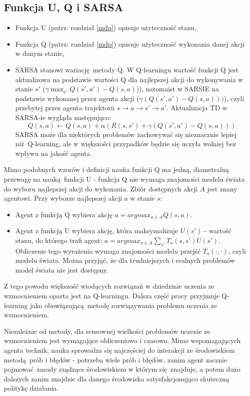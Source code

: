 \subsection{Funkcja U, Q i SARSA}\label{qlearning}
\begin{itemize}
\item Funkcja U (patrz: rozdział \ref{mdp}) opisuje użyteczność stanu,
\item Funkcja Q (patrz: rozdział \ref{mdp}) opisuje użyteczność wykonania danej akcji w danym stanie,
\item SARSA stanowi wariację metody Q. W Q-learningu wartość funkcji Q jest aktualizowa na podstawie wartości Q dla najlepszej akcji do wykonywania w stanie $s'$ ($\gamma \max_{a'}Q(s',a') - Q (s,a))$), natomaist w SARSIE na podstawie wykonanej przez agenta akcji ($\gamma (Q(s',a') - Q (s,a)))$), czyli przebytej przez agenta trajektorii $ s \rightarrow a \rightarrow s' \rightarrow a'$. Aktualizacja TD w SARSA-ie wygląda następująco:
$$Q(s,a) \leftarrow Q(s,a) + \alpha (R(s,s') + \gamma (Q(s',a') - Q (s,a)))$$
SARSA może dla niektórych problemów zachowywać się nieznacznie lepiej niż Q-learning, ale w większości przypadków będzie się uczyła wolniej bez wpływu na jakość agenta.
\end{itemize}

Mimo podobnych wzorów i definicji nauka funkcji Q ma jedną, diametralną przewagę na nauką funkcji U - funkcja Q nie wymaga znajomości modelu świata do wyboru najlepszej akcji do wykonania. Zbiór dostępnych akcji $A$ jest znany agentowi. Przy wyborze najlepszej akcji $a$ w stanie $s$:
\begin{itemize}
\item Agent z funkcją Q wybiera akcję $a = argmax_{a \in A} Q(s,a)$.

\item Agent z funkcją U wybiera akcję, która maksymalizuje $U(s')$ - wartość stanu, do którego trafi agent: $a = argmax_{a \in A} \sum_{s'} T_a(s,s')U(s')$. Obliczenie tego wyrażenia wymaga znajomości modelu przejść $T_a(\cdot, \cdot)$, czyli modelu świata. Można przyjąć, że dla trudniejszych i realnych problemów model świata nie jest dostępny.
\end{itemize}

Z tego powodu większość wiodących rozwiązań w dziedzinie uczenia ze wzmocnieniem oparta jest na Q-learningu.  Dalsza część pracy przyjmuje Q-learning jako obowiązującą metodę rozwiązywania problemu uczenia ze wzmocnieniem.

Niezależnie od metody, dla sensownej wielkości problemów uczenie ze wzmocnieniem jest wymagające obliczeniowo i czasowo. Mimo wspomagających agenta technik, nauka sprowadza się najczęściej do interakcji ze środowiskiem metodą prób i błędów - potrzeba wiele prób i błędów, zanim agent zacznie pojmować zasady rządzące środowiskiem w którym się znajduje, a potem dużo dalszych zanim znajdzie dla danego środowiska satysfakcjonująco skuteczną politykę działania.


